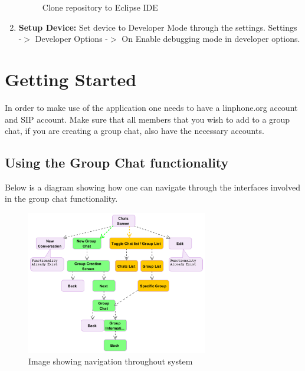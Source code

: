 \documentclass[11pt]{article}
\begin{document}
\begin{enumerate}
\begin{figure}[H]
\caption{Clone repository to Eclipse IDE}
\label{repoClone}
\end{figure}
\item \textbf{Setup Device: } Set device to Developer Mode through the settings. 
\subitem Settings -$>$ Developer Options -$>$ On
\subitem Enable debugging mode in developer options.
\end{enumerate}

\section{Getting Started}
In order to make use of the application one needs to have a linphone.org account and SIP account. Make sure that all members that you wish to add to a group chat, if you are creating a group chat, also have the necessary accounts.
\subsection{Using the Group Chat functionality}
Below is a diagram showing how one can navigate through the interfaces involved in the group chat functionality. \\
\begin{figure}[H]
\includegraphics[width=300px]{./images/flow.png}
 \caption{Image showing navigation throughout system}
 \label{flow}
 \end{figure}
\end{document}
